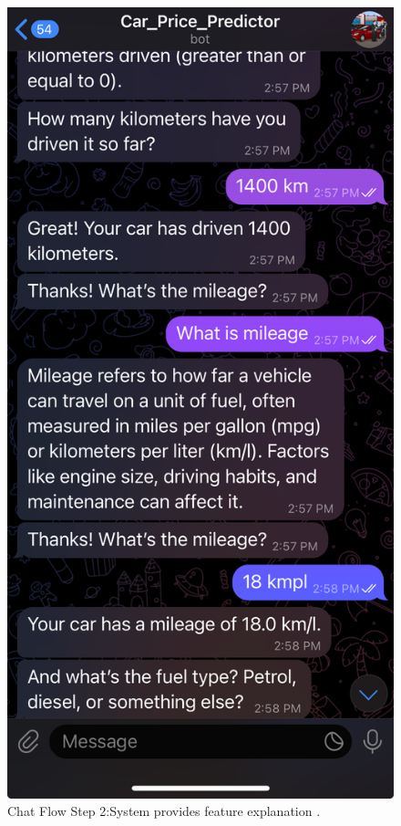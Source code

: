 \documentclass[a4paper,12pt]{article}
\begin{document}
\begin{justify}
\begin{figure}[h!]
\begin{minipage}{0.45\textwidth}
		\label{fig:step1}
	\end{minipage}%
	\hspace{0.05\textwidth} %
	\begin{minipage}{0.45\textwidth}
		\centering
		\includegraphics[width=\textwidth]{2.jpg}
		\caption{Chat Flow Step 2:System provides feature explanation .}
		\label{fig:step2}
	\end{minipage}
\end{figure}


\end{justify}
\end{document}

